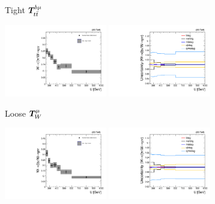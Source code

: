 \begin{figure}[]
\begin{center}
\begin{subfigure}[t]{0.49\textwidth}
            \caption{Tight $\bm{T}^{b\mu}_{t\bar{t}}$}
        \end{subfigure}
        \begin{subfigure}[t]{0.49\textwidth}
            \includegraphics[width=0.49\textwidth]{figures/monotop/xfer/rfactor_singlemuonw_loose.pdf}
            \includegraphics[width=0.49\textwidth]{figures/monotop/uncertainties/variations_singlemuonw_loose.pdf}
            \caption{Loose $\bm{T}^{\mu}_{W}$}
        \end{subfigure}
        \begin{subfigure}[t]{0.49\textwidth}
            \includegraphics[width=0.49\textwidth]{figures/monotop/xfer/rfactor_singlemuonw.pdf}
            \includegraphics[width=0.49\textwidth]{figures/monotop/uncertainties/variations_singlemuonw.pdf}

\end{subfigure}
\end{center}
\end{figure}

